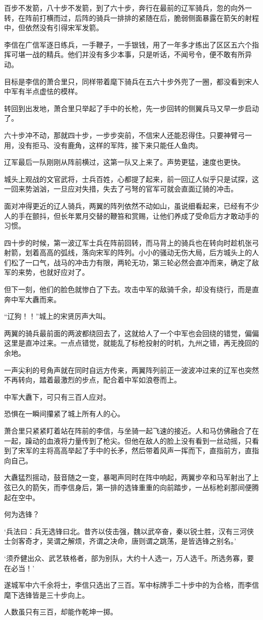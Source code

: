 百步不发箭，八十步不发箭，到了六十步，奔行在最前的辽军骑兵，忽的向外一转，在阵前打横而过，后阵的骑兵一排排的紧随在后，脆弱侧面暴露在箭矢的射程中，但依然没有引得宋军发箭。

李信在广信军逐日练兵，一手鞭子，一手银钱，用了一年多才练出了区区五六个指挥可堪一战的精兵。他们并没有多少本事，只是听话，不闻号令，便不敢有所异动。

目标是李信的萧合里只，同样带着麾下骑兵在五六十步外兜了一圈，都没看到宋人中军有半点虚怯的模样。

转回到出发地，萧合里只举起了手中的长枪，先一步回转的侧翼兵马又早一步启动了。

六十步冲不动，那就四十步，一步步突前，不信宋人还能忍得住。只要神臂弓一用，没有拒马、没有鹿角，这样的军阵，接下来只能任人鱼肉。

辽军最后一队刚刚从阵前横过，这第一队又上来了。声势更猛，速度也更快。

城头上观战的文官武将，士兵百姓，心都提了起来，前一回辽人似乎只是试探，这一回来势汹汹，一旦应对失措，失去了弓弩的官军可就会直面辽骑的冲击。

面对冲得更近的辽人骑兵，两翼的阵列依然不动如山，虽说细看起来，已经有不少人的手在颤抖，但长年累月交替的鞭笞和赏赐，让他们养成了受命后方才敢动手的习惯。

四十步的时候，第一波辽军士兵在阵前回转，而马背上的骑兵也在转向时趁机张弓射箭，划着高高的弧线，落向宋军的阵列。小小的骚动无伤大局，后方城头上的人们松了一口气，战马的冲击力有限，两轮无功，第三轮必然会直冲而来，确定了敌军的来势，也就好应对了。

但下一刻，他们的脸色就惨白了下去。攻击中军的敌骑千余，却没有绕行，而是直奔中军大纛而来。

“辽狗！！”城上的宋贤厉声大叫。

两翼的骑兵最前面的两波都绕回去了，这就给人了一个中军也会回绕的错觉，偏偏这里是直冲过来。一点点错觉，就能乱了标枪投射的时机，九州之错，再无挽回的余地。

一声尖利的号角声就在同时自远方传来，两翼阵列前正一波波冲过来的辽军也突然不再转向，踏着最激烈的步点，配合着中军如浪卷而上。

中军大纛下，可只有三百人应对。

恐惧在一瞬间攥紧了城上所有人的心。

萧合里只紧紧盯着站在阵前的李信，与坐骑一起飞速的接近。人和马仿佛融合了在一起，躁动的血液将力量传到了枪尖。但他在敌人的脸上没有看到一丝动摇，只看到了宋军的主将高高举起了手中的长矛，然后带着风声一挥而下，直指前方，直指向自己。

大纛猛烈摇动，鼓音随之一变，暴喝声同时在阵中响起，两翼步卒和马军射出了上弦已久的箭矢，而李信身后，第一排的选锋重重的向前踏步，一丛标枪刹那间便腾起在空中。

何为选锋？

‘兵法曰：兵无选锋曰北。昔齐以伎击强，魏以武卒奋，秦以锐士胜，汉有三河侠士剑客奇才，吴谓之解烦，齐谓之决命，唐则谓之跳荡，是皆选锋之别名。’

‘须乔健出众、武艺轶格者，部为别队，大约十人选一，万人选千。所选务寡，要在必当！’

遂城军中六千余将士，李信只选出了三百。军中标牌手二十步中的为合格，而李信麾下选锋皆是三十步向上。

人数虽只有三百，却能作乾坤一掷。
